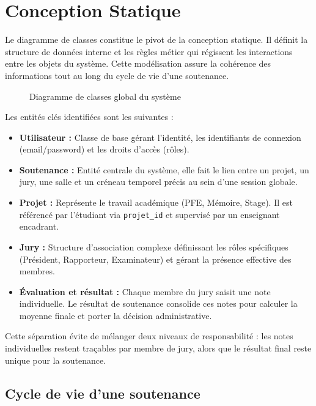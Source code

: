 \documentclass[12pt,a4paper]{article}
\begin{document}
\section{Conception Statique}
\label{sec:statique}

Le diagramme de classes constitue le pivot de la conception statique. Il définit la structure de données interne et les règles métier qui régissent les interactions entre les objets du système. Cette modélisation assure la cohérence des informations tout au long du cycle de vie d'une soutenance.

\begin{figure}[H]
    \centering
    \caption{Diagramme de classes global du système}
\end{figure}

Les entités clés identifiées sont les suivantes :
\begin{itemize}[label=\textcolor{primary}{\textbullet}]
    \item \textbf{Utilisateur :} Classe de base gérant l'identité, les identifiants de connexion (email/password) et les droits d'accès (rôles).
    \item \textbf{Soutenance :} Entité centrale du système, elle fait le lien entre un projet, un jury, une salle et un créneau temporel précis au sein d'une session globale.
    \item \textbf{Projet :} Représente le travail académique (PFE, Mémoire, Stage). Il est référencé par l'étudiant via \texttt{projet\_id} et supervisé par un enseignant encadrant.
    \item \textbf{Jury :} Structure d'association complexe définissant les rôles spécifiques (Président, Rapporteur, Examinateur) et gérant la présence effective des membres.
    \item \textbf{Évaluation et résultat :} Chaque membre du jury saisit une note individuelle. Le résultat de soutenance consolide ces notes pour calculer la moyenne finale et porter la décision administrative.
\end{itemize}

Cette séparation évite de mélanger deux niveaux de responsabilité : les notes
individuelles restent traçables par membre de jury, alors que le résultat final
reste unique pour la soutenance.

\subsection{Cycle de vie d'une soutenance}
\end{document}
